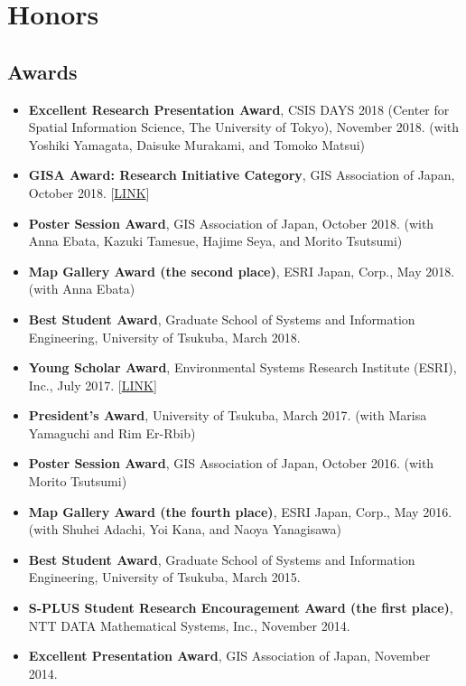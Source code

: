 \documentclass[]{book}
\providecommand{\tightlist}{%
  \setlength{\itemsep}{0pt}\setlength{\parskip}{0pt}}
\begin{document}
\hypertarget{honors}{%
\chapter*{Honors}\label{honors}}

\hypertarget{awards}{%
\section*{Awards}\label{awards}}

\begin{itemize}
\tightlist
\item
  \textbf{Excellent Research Presentation Award}, CSIS DAYS 2018 (Center for Spatial Information Science, The University of Tokyo), November 2018.
  (with Yoshiki Yamagata, Daisuke Murakami, and Tomoko Matsui)
\item
  \textbf{GISA Award: Research Initiative Category}, GIS Association of Japan, October 2018. {[}\href{http://www.gisa-japan.org/file/nl108.pdf}{LINK}{]}
\item
  \textbf{Poster Session Award}, GIS Association of Japan, October 2018.
  (with Anna Ebata, Kazuki Tamesue, Hajime Seya, and Morito Tsutsumi)
\item
  \textbf{Map Gallery Award (the second place)}, ESRI Japan, Corp., May 2018.
  (with Anna Ebata)
\item
  \textbf{Best Student Award}, Graduate School of Systems and Information Engineering, University of Tsukuba, March 2018.
\item
  \textbf{Young Scholar Award}, Environmental Systems Research Institute (ESRI), Inc., July 2017. {[}\href{https://www.esrij.com/cgi-bin/wp/wp-content/uploads/2017/01/YSA-Taiken2017.pdf}{LINK}{]}
\item
  \textbf{President's Award}, University of Tsukuba, March 2017.
  (with Marisa Yamaguchi and Rim Er-Rbib)
\item
  \textbf{Poster Session Award}, GIS Association of Japan, October 2016.
  (with Morito Tsutsumi)
\item
  \textbf{Map Gallery Award (the fourth place)}, ESRI Japan, Corp., May 2016.
  (with Shuhei Adachi, Yoi Kana, and Naoya Yanagisawa)
\item
  \textbf{Best Student Award}, Graduate School of Systems and Information Engineering, University of Tsukuba, March 2015.
\item
  \textbf{S-PLUS Student Research Encouragement Award (the first place)}, NTT DATA Mathematical Systems, Inc., November 2014.
\item
  \textbf{Excellent Presentation Award}, GIS Association of Japan, November 2014.
\end{itemize}
\end{document}
